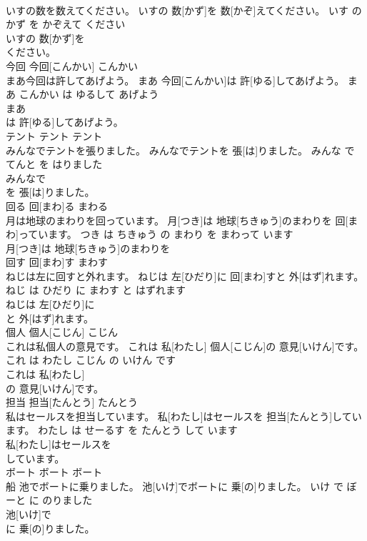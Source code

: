 \documentclass[8pt]{extreport}
\begin{document}
\begin{CJK}{UTF8}{min}
\\	いすの数を数えてください。	いすの 数[かず]を 数[かぞ]えてください。	いす の かず を かぞえて ください	
\\	いすの 数[かず]を
\\	ください。		
\\	今回	今回[こんかい]	こんかい	
\\	まあ今回は許してあげよう。	まあ 今回[こんかい]は 許[ゆる]してあげよう。	まあ こんかい は ゆるして あげよう	
\\	まあ
\\	は 許[ゆる]してあげよう。		
\\	テント	テント	テント	
\\	みんなでテントを張りました。	みんなでテントを 張[は]りました。	みんな で てんと を はりました	
\\	みんなで
\\	を 張[は]りました。		
\\	回る	回[まわ]る	まわる	
\\	月は地球のまわりを回っています。	月[つき]は 地球[ちきゅう]のまわりを 回[まわ]っています。	つき は ちきゅう の まわり を まわって います	
\\	月[つき]は 地球[ちきゅう]のまわりを
\\	回す	回[まわ]す	まわす	
\\	ねじは左に回すと外れます。	ねじは 左[ひだり]に 回[まわ]すと 外[はず]れます。	ねじ は ひだり に まわす と はずれます	
\\	ねじは 左[ひだり]に
\\	と 外[はず]れます。		
\\	個人	個人[こじん]	こじん	
\\	これは私個人の意見です。	これは 私[わたし] 個人[こじん]の 意見[いけん]です。	これ は わたし こじん の いけん です	
\\	これは 私[わたし]
\\	の 意見[いけん]です。		
\\	担当	担当[たんとう]	たんとう	
\\	私はセールスを担当しています。	私[わたし]はセールスを 担当[たんとう]しています。	わたし は せーるす を たんとう して います	
\\	私[わたし]はセールスを
\\	しています。		
\\	ボート	ボート	ボート	
\\	船	池でボートに乗りました。	池[いけ]でボートに 乗[の]りました。	いけ で ぼーと に のりました	
\\	池[いけ]で
\\	に 乗[の]りました。		

\end{CJK}
\end{document}
